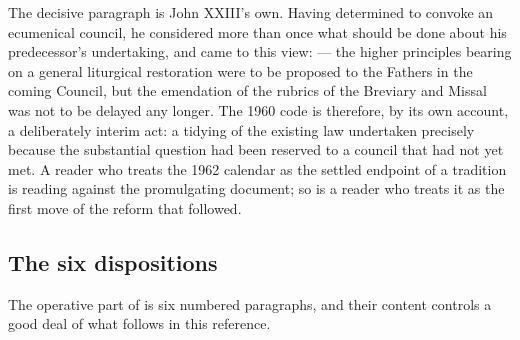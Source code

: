The decisive paragraph is John XXIII's own. Having determined to convoke an ecumenical council,
he considered more than once what should be done about his predecessor's undertaking, and came
to this view:  — the higher principles bearing on a
general liturgical restoration were to be proposed to the Fathers in the coming Council, but the
emendation of the rubrics of the Breviary and Missal was not to be delayed any longer. The 1960
code is therefore, by its own account, a deliberately interim act: a tidying of the existing law
undertaken precisely because the substantial question had been reserved to a council that had
not yet met. A reader who treats the 1962 calendar as the settled endpoint of a tradition is
reading against the promulgating document; so is a reader who treats it as the first move of
the reform that followed.

\subsection{The six dispositions}

The operative part of  is six numbered paragraphs, and their
content controls a good deal of what follows in this reference.

